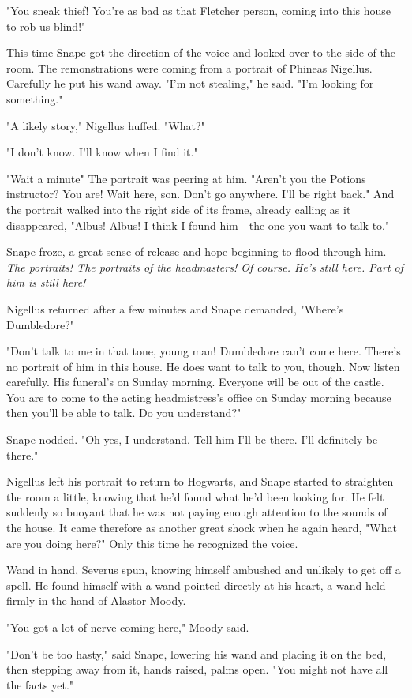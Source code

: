 "You sneak thief! You're as bad as that Fletcher person, coming into this house to rob us blind!"

This time Snape got the direction of the voice and looked over to the side of the room. The remonstrations were coming from a portrait of Phineas Nigellus. Carefully he put his wand away. "I'm not stealing," he said. "I'm looking for something."

"A likely story," Nigellus huffed. "What?"

"I don't know. I'll know when I find it."

"Wait a minute{\el}" The portrait was peering at him. "Aren't you the Potions instructor? You are! Wait here, son. Don't go anywhere. I'll be right back." And the portrait walked into the right side of its frame, already calling as it disappeared, "Albus! Albus! I think I found him—the one you want to talk to."

Snape froze, a great sense of release and hope beginning to flood through him. \emph{The portraits! The portraits of the headmasters! Of course. He's still here. Part of him is still here!}

Nigellus returned after a few minutes and Snape demanded, "Where's Dumbledore?"

"Don't talk to me in that tone, young man! Dumbledore can't come here. There's no portrait of him in this house. He does want to talk to you, though. Now listen carefully. His funeral's on Sunday morning. Everyone will be out of the castle. You are to come to the acting headmistress's office on Sunday morning because then you'll be able to talk. Do you understand?"

Snape nodded. "Oh yes, I understand. Tell him I'll be there. I'll definitely be there."

Nigellus left his portrait to return to Hogwarts, and Snape started to straighten the room a little, knowing that he'd found what he'd been looking for. He felt suddenly so buoyant that he was not paying enough attention to the sounds of the house. It came therefore as another great shock when he again heard, "What are you doing here?" Only this time he recognized the voice.

Wand in hand, Severus spun, knowing himself ambushed and unlikely to get off a spell. He found himself with a wand pointed directly at his heart, a wand held firmly in the hand of Alastor Moody.

"You got a lot of nerve coming here," Moody said.

"Don't be too hasty," said Snape, lowering his wand and placing it on the bed, then stepping away from it, hands raised, palms open. "You might not have all the facts yet."

